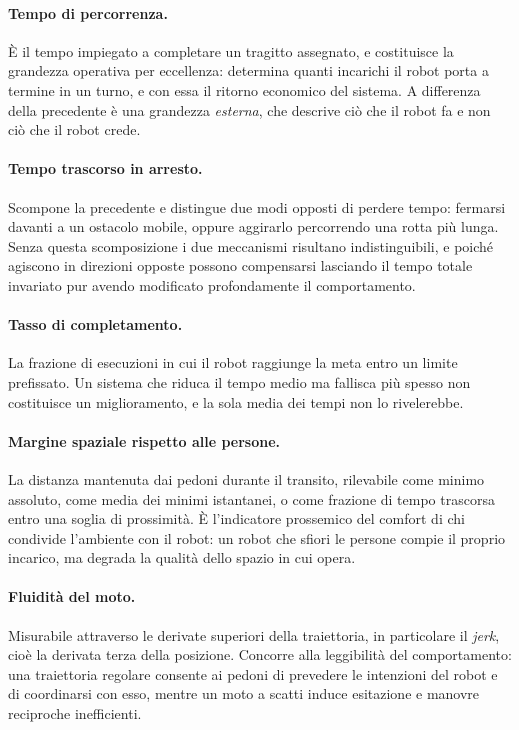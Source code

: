 \paragraph{Tempo di percorrenza.} È il tempo impiegato a completare un tragitto assegnato,
e costituisce la grandezza operativa per eccellenza: determina quanti incarichi il robot
porta a termine in un turno, e con essa il ritorno economico del sistema. A differenza
della precedente è una grandezza \emph{esterna}, che descrive ciò che il robot fa e non
ciò che il robot crede.

\paragraph{Tempo trascorso in arresto.} Scompone la precedente e distingue due modi
opposti di perdere tempo: fermarsi davanti a un ostacolo mobile, oppure aggirarlo
percorrendo una rotta più lunga. Senza questa scomposizione i due meccanismi risultano
indistinguibili, e poiché agiscono in direzioni opposte possono compensarsi lasciando il
tempo totale invariato pur avendo modificato profondamente il comportamento.

\paragraph{Tasso di completamento.} La frazione di esecuzioni in cui il robot raggiunge la
meta entro un limite prefissato. Un sistema che riduca il tempo medio ma fallisca più
spesso non costituisce un miglioramento, e la sola media dei tempi non lo rivelerebbe.

\paragraph{Margine spaziale rispetto alle persone.} La distanza mantenuta dai pedoni
durante il transito, rilevabile come minimo assoluto, come media dei minimi istantanei, o
come frazione di tempo trascorsa entro una soglia di prossimità. È l'indicatore prossemico
del comfort di chi condivide l'ambiente con il robot: un robot che sfiori le persone
compie il proprio incarico, ma degrada la qualità dello spazio in cui opera.

\paragraph{Fluidità del moto.} Misurabile attraverso le derivate superiori della
traiettoria, in particolare il \emph{jerk}, cioè la derivata terza della posizione.
Concorre alla leggibilità del comportamento: una traiettoria regolare consente ai pedoni
di prevedere le intenzioni del robot e di coordinarsi con esso, mentre un moto a scatti
induce esitazione e manovre reciproche inefficienti.

